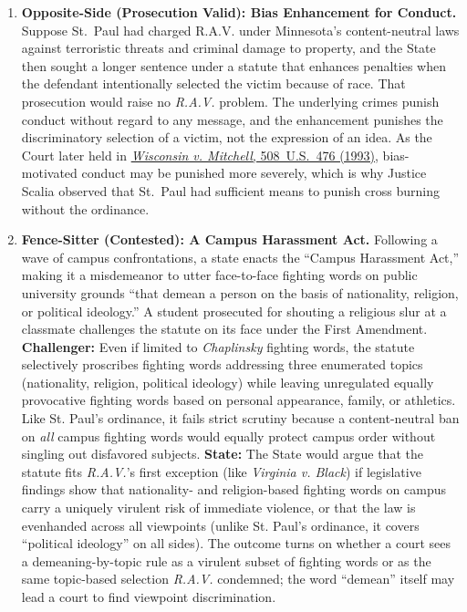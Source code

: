 \documentclass[12pt]{article}
\begin{document}
\begin{enumerate}
\item \textbf{Opposite-Side (Prosecution Valid): Bias Enhancement for Conduct.} Suppose St.~Paul had charged R.A.V. under Minnesota's content-neutral laws against terroristic threats and criminal damage to property, and the State then sought a longer sentence under a statute that enhances penalties when the defendant intentionally selected the victim because of race. That prosecution would raise no \textit{R.A.V.} problem. The underlying crimes punish conduct without regard to any message, and the enhancement punishes the discriminatory selection of a victim, not the expression of an idea. As the Court later held in \href{https://supreme.justia.com/cases/federal/us/508/476/}{\textit{Wisconsin v. Mitchell}, 508~U.S.~476 (1993)}, bias-motivated conduct may be punished more severely, which is why Justice Scalia observed that St.~Paul had sufficient means to punish cross burning without the ordinance.

\item \textbf{Fence-Sitter (Contested): A Campus Harassment Act.} Following a wave of campus confrontations, a state enacts the ``Campus Harassment Act,'' making it a misdemeanor to utter face-to-face fighting words on public university grounds ``that demean a person on the basis of nationality, religion, or political ideology.'' A student prosecuted for shouting a religious slur at a classmate challenges the statute on its face under the First Amendment. \textbf{Challenger:} Even if limited to \textit{Chaplinsky} fighting words, the statute selectively proscribes fighting words addressing three enumerated topics (nationality, religion, political ideology) while leaving unregulated equally provocative fighting words based on personal appearance, family, or athletics. Like St. Paul's ordinance, it fails strict scrutiny because a content-neutral ban on \textit{all} campus fighting words would equally protect campus order without singling out disfavored subjects. \textbf{State:} The State would argue that the statute fits \textit{R.A.V.}'s first exception (like \textit{Virginia v. Black}) if legislative findings show that nationality- and religion-based fighting words on campus carry a uniquely virulent risk of immediate violence, or that the law is evenhanded across all viewpoints (unlike St. Paul's ordinance, it covers ``political ideology'' on all sides). The outcome turns on whether a court sees a demeaning-by-topic rule as a virulent subset of fighting words or as the same topic-based selection \textit{R.A.V.} condemned; the word ``demean'' itself may lead a court to find viewpoint discrimination.

\end{enumerate}
\end{document}

